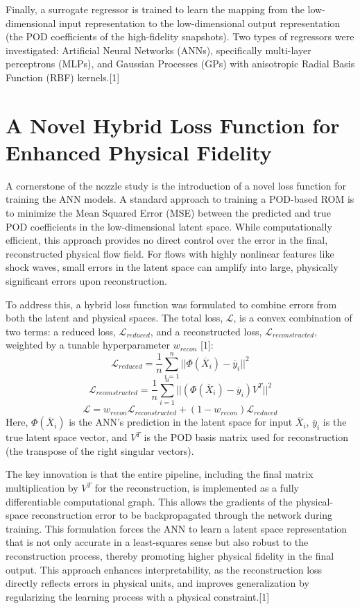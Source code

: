 \documentclass[12pt, a4paper]{report}
\begin{document}
Finally, a surrogate regressor is trained to learn the mapping from the low-dimensional input representation to the low-dimensional output representation (the POD coefficients of the high-fidelity snapshots). Two types of regressors were investigated: Artificial Neural Networks (ANNs), specifically multi-layer perceptrons (MLPs), and Gaussian Processes (GPs) with anisotropic Radial Basis Function (RBF) kernels.[1]

\section{A Novel Hybrid Loss Function for Enhanced Physical Fidelity}

A cornerstone of the nozzle study is the introduction of a novel loss function for training the ANN models. A standard approach to training a POD-based ROM is to minimize the Mean Squared Error (MSE) between the predicted and true POD coefficients in the low-dimensional latent space. While computationally efficient, this approach provides no direct control over the error in the final, reconstructed physical flow field. For flows with highly nonlinear features like shock waves, small errors in the latent space can amplify into large, physically significant errors upon reconstruction.

To address this, a hybrid loss function was formulated to combine errors from both the latent and physical spaces. The total loss, $\mathcal{L}$, is a convex combination of two terms: a reduced loss, $\mathcal{L}_{reduced}$, and a reconstructed loss, $\mathcal{L}_{reconstructed}$, weighted by a tunable hyperparameter $w_{recon}$ [1]:
$$\mathcal{L}_{reduced} = \frac{1}{n}\sum_{i=1}^{n}||\Phi(\overline{X}_{i}) - \overline{y}_{i}||^{2}$$
$$ \mathcal{L}_{reconstructed} = \frac{1}{n}\sum_{i=1}^{n}||(\Phi(\overline{X}_{i}) - \overline{y}_{i})V^{T}||^{2} $$$$ \mathcal{L} = w_{recon}\mathcal{L}_{reconstructed} + (1-w_{recon})\mathcal{L}_{reduced}$$
Here, $\Phi(\overline{X}_{i})$ is the ANN's prediction in the latent space for input $\overline{X}_{i}$, $\overline{y}_{i}$ is the true latent space vector, and $V^T$ is the POD basis matrix used for reconstruction (the transpose of the right singular vectors).

The key innovation is that the entire pipeline, including the final matrix multiplication by $V^T$ for the reconstruction, is implemented as a fully differentiable computational graph. This allows the gradients of the physical-space reconstruction error to be backpropagated through the network during training. This formulation forces the ANN to learn a latent space representation that is not only accurate in a least-squares sense but also robust to the reconstruction process, thereby promoting higher physical fidelity in the final output. This approach enhances interpretability, as the reconstruction loss directly reflects errors in physical units, and improves generalization by regularizing the learning process with a physical constraint.[1]
\end{document}
